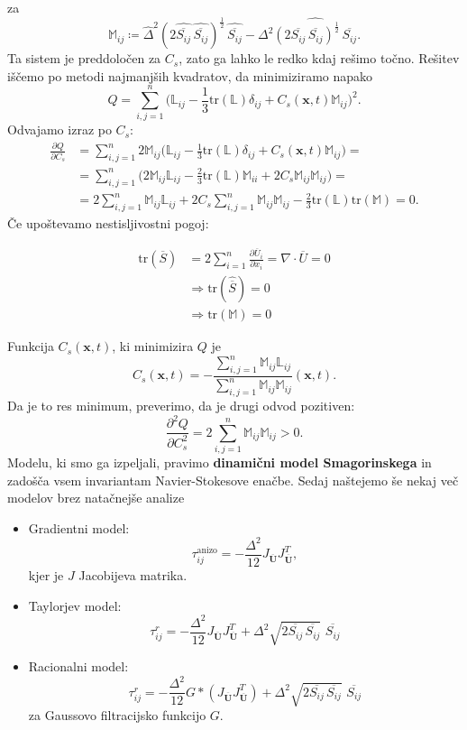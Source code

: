 \documentclass[mat2, tisk]{fmfdelo}
\newcommand{\bd}{\textbf}
\begin{document}
za 
$$
\mathbb{M}_{ij} \coloneqq \widehat{\Delta}^2 (2 \widehat{\overline{S_{ij}}} \,\widehat{\overline{S_{ij}}})^\frac{1}{2} \,\widehat{\overline{S_{ij}}} - \Delta^2 \widehat{(2 \overline{S_{ij}} \,\overline{S_{ij}})^\frac{1}{2} \,\overline{S_{ij}}}.
$$
Ta sistem je preddoločen za $C_s$, zato ga lahko le redko kdaj rešimo točno.
Rešitev iščemo po metodi najmanjših kvadratov, da minimiziramo napako
$$
Q = \sum_{i,j=1}^n \Big(\mathbb{L}_{ij} - \frac{1}{3}\text{tr}(\mathbb{L}) \delta_{ij} + C_s(\bd{x}, t)\mathbb{M}_{ij}\Big)^2.
$$
Odvajamo izraz po $C_s$:
\begin{align*}
  \frac{\partial Q}{\partial C_s} &= \sum_{i,j=1}^n 2\mathbb{M}_{ij}\Big(\mathbb{L}_{ij} - \frac{1}{3}\text{tr}(\mathbb{L}) \delta_{ij} + C_s(\bd{x}, t)\mathbb{M}_{ij}\Big) =\\
  &= \sum_{i,j=1}^n \Big(2\mathbb{M}_{ij} \mathbb{L}_{ij} - \frac{2}{3} \text{tr}({\mathbb{L}}) \mathbb{M}_{ii} + 2C_s \mathbb{M}_{ij} \mathbb{M}_{ij}\Big)= \\
  &= 2\sum_{i,j=1}^n \mathbb{M}_{ij} \mathbb{L}_{ij} + 2C_s \sum_{i,j=1}^n \mathbb{M}_{ij} \mathbb{M}_{ij} - \frac{2}{3} \text{tr}({\mathbb{L}}) \text{tr}(\mathbb{M}) = 0.
\end{align*}
Če upoštevamo nestisljivostni pogoj: 

\begin{align*}
\text{tr}(\overline{S}) &= 2\sum_{i=1}^n \frac{\partial \overline{U}_i}{\partial x_i} = \nabla \cdot \overline{U} = 0 \\
&\Longrightarrow \text{tr}(\widehat{\overline{S}}) = 0 \\
&\Longrightarrow \text{tr}(\mathbb{M}) = 0
\end{align*}

Funkcija $C_s(\bd{x}, t)$, ki minimizira $Q$ je 
\begin{equation}
C_s(\bd{x}, t) = - \frac{\sum_{i,j=1}^n \mathbb{M}_{ij} \mathbb{L}_{ij}}{\sum_{i,j=1}^n \mathbb{M}_{ij} \mathbb{M}_{ij}}(\bd{x}, t).
\end{equation}
Da je to res minimum, preverimo, da je drugi odvod pozitiven: 
$$
\frac{\partial^2 Q}{\partial C_s^2} = 2\sum_{i,j=1}^n \mathbb{M}_{ij} \mathbb{M}_{ij} > 0.
$$
Modelu, ki smo ga izpeljali, pravimo \bd{dinamični model Smagorinskega} in zadošča vsem invariantam Navier-Stokesove enačbe.
Sedaj naštejemo še nekaj več modelov brez natačnejše analize 
\begin{itemize}
  \item Gradientni model:
  $$
  \tau_{ij}^\text{anizo} = -\frac{\Delta^2}{12} J_{\overline{\bd{U}}} J_{\overline{\bd{U}}}^T,
  $$
  kjer je $J$ Jacobijeva matrika.
  \item Taylorjev model:
  $$
  \tau_{ij}^r = -\frac{\Delta^2}{12} J_{\overline{\bd{U}}} J_{\overline{\bd{U}}}^T + \Delta^2 \sqrt{2\overline{S_{ij}}\,\overline{S_{ij}}}\,\, \overline{S_{ij}}
  $$
  \item Racionalni model:
  $$
  \tau_{ij}^r = -\frac{\Delta^2}{12} G*(J_{\overline{\bd{U}}} J_{\overline{\bd{U}}}^T) + \Delta^2 \sqrt{2\overline{S_{ij}}\,\overline{S_{ij}}}\,\, \overline{S_{ij}}
  $$
  za Gaussovo filtracijsko funkcijo $G$.
\end{itemize}
\end{document}
